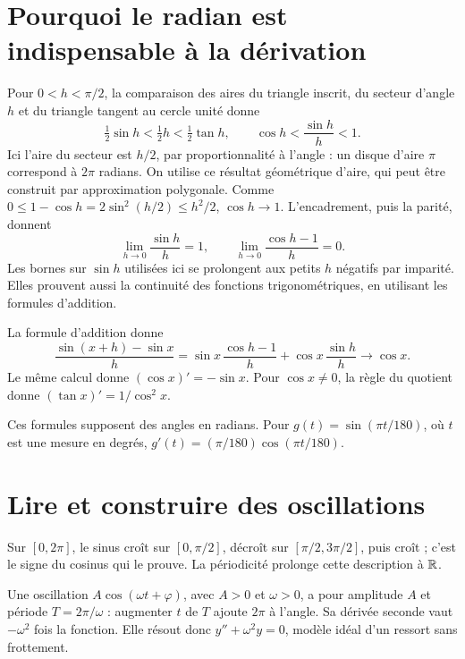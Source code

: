 \documentclass[../cours_1re.tex]{subfiles}
\begin{document}
\section{Pourquoi le radian est indispensable à la dérivation}
Pour $0<h<\pi/2$, la comparaison des aires du triangle inscrit,
du secteur d'angle $h$ et du triangle tangent au cercle unité donne
\[
\tfrac12\sin h<\tfrac12h<\tfrac12\tan h,\qquad
\cos h<\frac{\sin h}{h}<1.
\]
Ici l'aire du secteur est $h/2$, par proportionnalité à l'angle :
un disque d'aire $\pi$ correspond à $2\pi$ radians. On utilise ce résultat
géométrique d'aire, qui peut être construit par approximation polygonale.
Comme $0\le1-\cos h=2\sin^2(h/2)\le h^2/2$,
$\cos h\to1$. L'encadrement, puis la parité, donnent
\[
\lim_{h\to0}\frac{\sin h}{h}=1,\qquad
\lim_{h\to0}\frac{\cos h-1}{h}=0.
\]
Les bornes sur $\sin h$ utilisées ici se prolongent aux petits $h$ négatifs
par imparité. Elles prouvent aussi la continuité des fonctions trigonométriques,
en utilisant les formules d'addition.
\begin{demonstration}[dérivées]
La formule d'addition donne
\[
\frac{\sin(x+h)-\sin x}{h}
=\sin x\,\frac{\cos h-1}{h}+\cos x\,\frac{\sin h}{h}\longrightarrow\cos x.
\]
Le même calcul donne $(\cos x)'=-\sin x$. Pour $\cos x\ne0$,
la règle du quotient donne $(\tan x)'=1/\cos^2x$.
\end{demonstration}
\begin{attention}
Ces formules supposent des angles en radians. Pour $g(t)=\sin(\pi t/180)$,
où $t$ est une mesure en degrés, $g'(t)=(\pi/180)\cos(\pi t/180)$.
\end{attention}

\section{Lire et construire des oscillations}
Sur $[0,2\pi]$, le sinus croît sur $[0,\pi/2]$, décroît sur
$[\pi/2,3\pi/2]$, puis croît ; c'est le signe du cosinus qui le prouve.
La périodicité prolonge cette description à $\mathbb{R}$.
\begin{center}
\end{center}
Une oscillation $A\cos(\omega t+\varphi)$, avec $A>0$ et $\omega>0$,
a pour amplitude $A$ et période $T=2\pi/\omega$ : augmenter $t$ de $T$
ajoute $2\pi$ à l'angle. Sa dérivée seconde vaut $-\omega^2$ fois la fonction.
Elle résout donc $y''+\omega^2y=0$, modèle idéal d'un ressort sans frottement.
\end{document}

